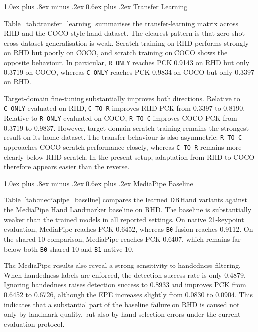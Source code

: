 \documentclass[10pt,letterpaper,twocolumn]{article}
\makeatletter
\renewcommand\subsection{\@startsection{subsection}{2}{\z@}%
  {1.0ex plus .8ex minus .2ex}%
  {0.6ex plus .2ex}%
  {\normalfont\itshape}}
\makeatother
\begin{document}
\subsection{Transfer Learning}

Table~\ref{tab:transfer_learning} summarises the transfer-learning matrix across RHD and the COCO-style hand dataset. The clearest pattern is that zero-shot cross-dataset generalisation is weak. Scratch training on RHD performs strongly on RHD but poorly on COCO, and scratch training on COCO shows the opposite behaviour. In particular, \texttt{R\_ONLY} reaches PCK 0.9143 on RHD but only 0.3719 on COCO, whereas \texttt{C\_ONLY} reaches PCK 0.9834 on COCO but only 0.3397 on RHD.

Target-domain fine-tuning substantially improves both directions. Relative to \texttt{C\_ONLY} evaluated on RHD, \texttt{C\_TO\_R} improves RHD PCK from 0.3397 to 0.8190. Relative to \texttt{R\_ONLY} evaluated on COCO, \texttt{R\_TO\_C} improves COCO PCK from 0.3719 to 0.9837. However, target-domain scratch training remains the strongest result on its home dataset. The transfer behaviour is also asymmetric: \texttt{R\_TO\_C} approaches COCO scratch performance closely, whereas \texttt{C\_TO\_R} remains more clearly below RHD scratch. In the present setup, adaptation from RHD to COCO therefore appears easier than the reverse.

\subsection{MediaPipe Baseline}

Table~\ref{tab:mediapipe_baseline} compares the learned DRHand variants against the MediaPipe Hand Landmarker baseline on RHD. The baseline is substantially weaker than the trained models in all reported settings. On native 21-keypoint evaluation, MediaPipe reaches PCK 0.6452, whereas \texttt{B0} fusion reaches 0.9112. On the shared-10 comparison, MediaPipe reaches PCK 0.6407, which remains far below both \texttt{B0} shared-10 and \texttt{B1} native-10.

The MediaPipe results also reveal a strong sensitivity to handedness filtering. When handedness labels are enforced, the detection success rate is only 0.4879. Ignoring handedness raises detection success to 0.8933 and improves PCK from 0.6452 to 0.6726, although the EPE increases slightly from 0.0830 to 0.0904. This indicates that a substantial part of the baseline failure on RHD is caused not only by landmark quality, but also by hand-selection errors under the current evaluation protocol.
\end{document}
